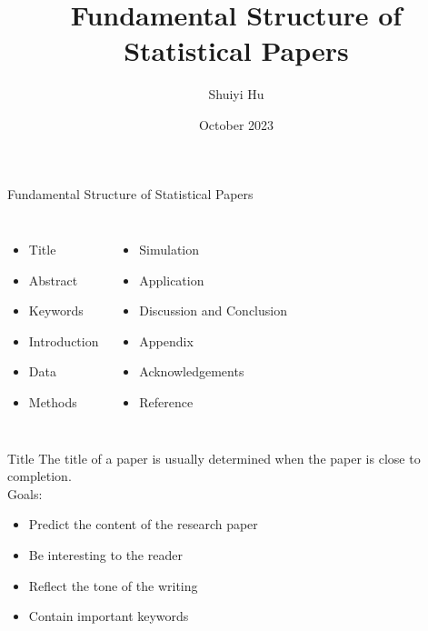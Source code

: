\documentclass{beamer}
\title{Fundamental Structure of Statistical Papers}
\author{Shuiyi Hu}
\institute{University of Connecticut}
\date{October 2023}
\begin{document}
\frame{\titlepage}


\begin{frame}{Fundamental Structure of Statistical Papers}
    \begin{columns}
            \centering
            \begin{itemize}
                \item Title
                \item Abstract
                \item Keywords
                \item Introduction
                \item Data
                \item Methods
            \end{itemize}
            \centering
            \begin{itemize}
                \item Simulation
                \item Application
                \item Discussion and Conclusion
                \item Appendix
                \item Acknowledgements
                \item Reference
            \end{itemize}
        \end{columns}
    \end{frame}
    
    
    \begin{frame}{Title}
    The title of a paper is usually determined when the paper is close to completion.\\
    Goals:
    \begin{itemize}
        \item Predict the content of the research paper
        \item Be interesting to the reader
        \item Reflect the tone of the writing
        \item Contain important keywords
    \end{itemize}
    
    \end{frame}
    
\end{document}
